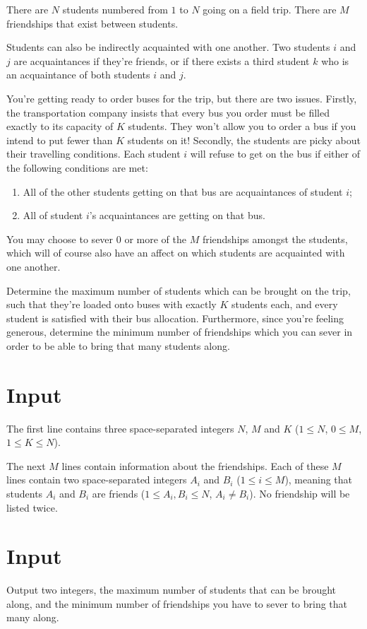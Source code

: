 There are $N$ students numbered from $1$ to $N$ going on a field trip.
There are $M$ friendships that exist between students.

Students can also be indirectly acquainted with one another.
Two students $i$ and $j$ are acquaintances if they're friends, or if there exists a third student $k$ who is an acquaintance of both students $i$ and $j$.

You're getting ready to order buses for the trip, but there are two issues.
Firstly, the transportation company insists that every bus you order must be filled exactly to its capacity of $K$ students.
They won't allow you to order a bus if you intend to put fewer than $K$ students on it!
Secondly, the students are picky about their travelling conditions.
Each student $i$ will refuse to get on the bus if either of the following conditions are met:
\begin{enumerate}
  \item All of the other students getting on that bus are acquaintances of student $i$;
  \item All of student $i$'s acquaintances are getting on that bus.
\end{enumerate}

You may choose to sever $0$ or more of the $M$ friendships amongst the students, which will of course also have an affect on which students are acquainted with one another.

Determine the maximum number of students which can be brought on the trip,
such that they're loaded onto buses with exactly $K$ students each, and every student is satisfied with their bus allocation.
Furthermore, since you're feeling generous, determine the minimum number of friendships which you can sever in order to be able to bring that many students along.

\section*{Input}
The first line contains three space-separated integers $N$, $M$ and $K$ ($1 \le N$, $0 \le M$, $1 \le K \le N$).

The next $M$ lines contain information about the friendships.
Each of these $M$ lines contain two space-separated integers $A_i$ and $B_i$ ($1 \le i \le M$), meaning that students $A_i$ and $B_i$ are friends ($1 \le A_i, B_i \le N$, $A_i \not= B_i$).
No friendship will be listed twice.

\section*{Input}
Output two integers, the maximum number of students that can be brought along, and the minimum number of friendships you have to sever to bring that many along.

